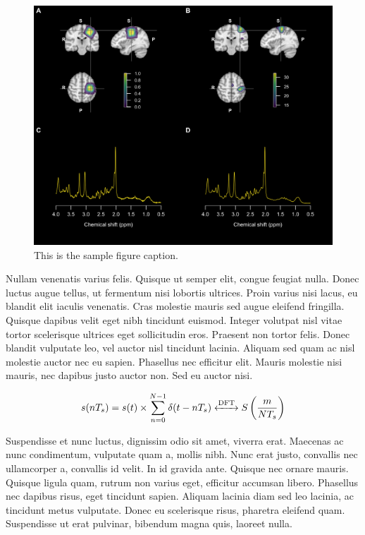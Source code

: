 \documentclass[AMA,STIX2COL,Linenumberson]{MRM}
\begin{document}
\begin{figure}
\centerline{\includegraphics[width=\textwidth]{FIGURES/Fig1.png}}
\caption{This is the sample figure caption.\label{fig1}}
\end{figure}

Nullam venenatis varius felis. Quisque ut semper elit, congue feugiat nulla. Donec luctus augue tellus, ut fermentum nisi lobortis ultrices. Proin varius nisi lacus, eu blandit elit iaculis venenatis. Cras molestie mauris sed augue eleifend fringilla. Quisque dapibus velit eget nibh tincidunt euismod. Integer volutpat nisl vitae tortor scelerisque ultrices eget sollicitudin eros. Praesent non tortor felis. Donec blandit vulputate leo, vel auctor nisl tincidunt lacinia. Aliquam sed quam ac nisl molestie auctor nec eu sapien. Phasellus nec efficitur elit. Mauris molestie nisi mauris, nec dapibus justo auctor non. Sed eu auctor nisi.

\begin{equation}
s(nT_{s}) = s(t)\times \sum\limits_{n=0}^{N-1} \delta (t-nT_{s}) \xleftrightarrow{\mathrm{DFT}}  S \left(\frac{m}{NT_{s}}\right)
\end{equation}

Suspendisse et nunc luctus, dignissim odio sit amet, viverra erat. Maecenas ac nunc condimentum, vulputate quam a, mollis nibh. Nunc erat justo, convallis nec ullamcorper a, convallis id velit. In id gravida ante. Quisque nec ornare mauris. Quisque ligula quam, rutrum non varius eget, efficitur accumsan libero. Phasellus nec dapibus risus, eget tincidunt sapien. Aliquam lacinia diam sed leo lacinia, ac tincidunt metus vulputate. Donec eu scelerisque risus, pharetra eleifend quam. Suspendisse ut erat pulvinar, bibendum magna quis, laoreet nulla.
\end{document}

